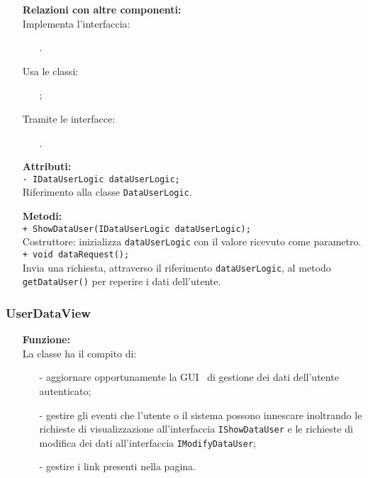 {\begin{sloppypar}
{{\begin{itemize}
			\item[] \textbf{Relazioni con altre componenti:}\\
				Implementa l'interfaccia:
				\begin{itemize}
					\item[] .
				\end{itemize}
				Usa le classi:
				\begin{itemize}
					\item[] ;
				\end{itemize}
				Tramite le interfacce:
				\begin{itemize}
					\item[] .\\
				\end{itemize}

			\item[] \textbf{Attributi:}\\
				\texttt{- IDataUserLogic dataUserLogic;}\\
				Riferimento alla classe \texttt{DataUserLogic}.\\
				
			\item[] \textbf{Metodi:}\\
				\texttt{+ ShowDataUser(IDataUserLogic dataUserLogic);}\\
				Costruttore: inizializza \texttt{dataUserLogic} con il valore ricevuto come parametro.\\
				
				\texttt{+ void dataRequest();}\\
				Invia una richiesta, attraverso il riferimento \texttt{dataUserLogic}, al metodo \texttt{getDataUser()} per reperire i dati dell'utente.\\
		\end{itemize}
		}
		
		\subsubsection{UserDataView}\label{ssub:UserDataView}{
		\begin{itemize}
			\item[] \textbf{Funzione:}\\
				  La classe ha il compito di:
				\begin{itemize}
					\item[-] aggiornare opportunamente la GUI\g~ di gestione dei dati dell'utente autenticato;
					\item[-] gestire gli eventi che l'utente o il sistema possono innescare inoltrando le richieste di visualizzazione all'interfaccia \texttt{IShowDataUser} e le richieste di modifica dei dati all'interfaccia \texttt{IModifyDataUser};
					\item[-] gestire i link presenti nella pagina.\\
				\end{itemize}
				

\end{itemize}}}
\end{sloppypar}}
